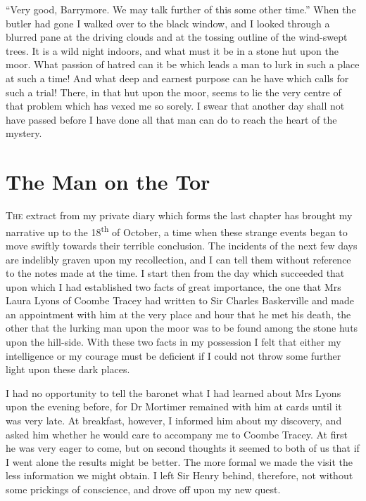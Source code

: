 \documentclass[paper=5.5in:8.5in,BCOR=7mm,twoside,DIV=calc,12pt,usegeometry,openany,chapterprefix,endperiod,headings=big]{scrbook} %
\begin{document}
\enquote{Very good, Barrymore. We may talk further of this some other time.} When the butler had gone I walked over to the black window, and I looked through a blurred pane at the driving clouds and at the tossing outline of the wind-swept trees. It is a wild night indoors, and what must it be in a stone hut upon the moor. What passion of hatred can it be which leads a man to lurk in such a place at such a time! And what deep and earnest purpose can he have which calls for such a trial! There, in that hut upon the moor, seems to lie the very centre of that problem which has vexed me so sorely. I swear that another day shall not have passed before I have done all that man can do to reach the heart of the mystery.


\chapter{The Man on the Tor}
\lettrine[lines=1]{T}{he} extract from my private diary which forms the last chap\-ter has brought my narrative up to the 18\textsuperscript{th} of October, a time when these strange events began to move swiftly towards their terrible conclusion. The incidents of the next few days are indelibly graven upon my recollection, and I can tell them without reference to the notes made at the time. I start then from the day which succeeded that upon which I had established two facts of great importance, the one that Mrs Laura Lyons of Coombe Tracey had written to Sir Charles Baskerville and made an appointment with him at the very place and hour that he met his death, the other that the lurking man upon the moor was to be found among the stone huts upon the hill-side. With these two facts in my possession I felt that either my intelligence or my courage must be deficient if I could not throw some further light upon these dark places.

I had no opportunity to tell the baronet what I had learned about Mrs Lyons upon the evening before, for Dr Mortimer remained with him at cards until it was very late. At breakfast, however, I informed him about my discovery, and asked him whether he would care to accompany me to Coombe Tracey. At first he was very eager to come, but on second thoughts it seemed to both of us that if I went alone the results might be better. The more formal we made the visit the less information we might obtain. I left Sir Henry behind, therefore, not without some prickings of conscience, and drove off upon my new quest.
\end{document}
